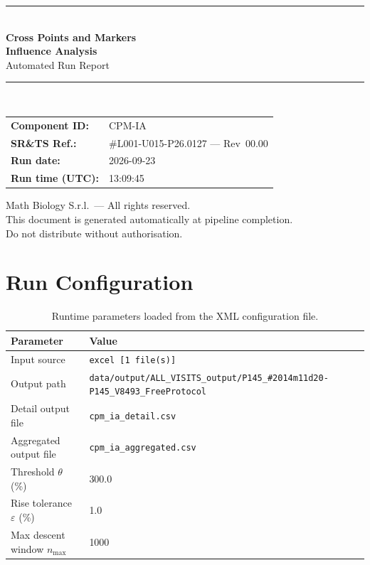 \documentclass[a4paper,11pt]{article}
\begin{document}
\begin{titlepage}
\begin{center}
  \vspace*{1.8cm}
  {\color{dmaaccent}\rule{\linewidth}{1.5pt}}\\[0.6cm]
  {\LARGE\bfseries\color{dmaaccent}
    Cross Points and Markers\\[0.25cm]
    Influence Analysis}\\[0.4cm]
  {\Large Automated Run Report}\\[0.3cm]
  {\color{dmaaccent}\rule{\linewidth}{1.5pt}}\\[2cm]

  \begin{tabular}{ll}
    \textbf{Component ID:}   & CPM-IA \\[0.3cm]
    \textbf{SR\&TS Ref.:}    & \#L001-U015-P26.0127 --- Rev~00.00 \\[0.3cm]
    \textbf{Run date:}       & 2026-09-23 \\[0.3cm]
    \textbf{Run time (UTC):} & 13:09:45 \\
  \end{tabular}

  \vfill
  {\color{dmagray}\small
    Math Biology S.r.l.\ --- All rights reserved.\\
    This document is generated automatically at pipeline completion.\\
    Do not distribute without authorisation.}
\end{center}
\end{titlepage}

\tableofcontents
\clearpage

\section{Run Configuration}

\begin{table}[h!]
\centering
\small
\caption{Runtime parameters loaded from the XML configuration file.}
\begin{tabular}{ll}
\toprule
\textbf{Parameter} & \textbf{Value} \\
\midrule
Input source                      & \texttt{excel [1 file(s)]} \\
Output path                       & \texttt{data/output/ALL\_VISITS\_output/P145\_\#2014m11d20-P145\_V8493\_FreeProtocol} \\
Detail output file                & \texttt{cpm\_ia\_detail.csv} \\
Aggregated output file            & \texttt{cpm\_ia\_aggregated.csv} \\
Threshold $\theta$ (\%)           & 300.0 \\
Rise tolerance $\varepsilon$ (\%) & 1.0 \\
Max descent window $n_{\max}$     & 1000 \\
\bottomrule
\end{tabular}
\end{table}
\end{document}
